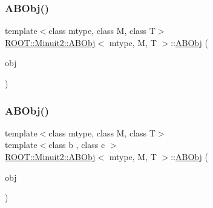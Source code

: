 \subsubsection{\texorpdfstring{ABObj()}{ABObj()}\hspace{0.1cm}{\footnotesize\ttfamily [7/12]}}
{\footnotesize\ttfamily template$<$class mtype, class M, class T$>$ \\
\mbox{\hyperlink{classROOT_1_1Minuit2_1_1ABObj}{R\+O\+O\+T\+::\+Minuit2\+::\+A\+B\+Obj}}$<$ mtype, M, T $>$\+::\mbox{\hyperlink{classROOT_1_1Minuit2_1_1ABObj}{A\+B\+Obj}} (\begin{DoxyParamCaption}\item[{const \mbox{\hyperlink{classROOT_1_1Minuit2_1_1ABObj}{A\+B\+Obj}}$<$ mtype, M, T $>$ \&}]{obj }\end{DoxyParamCaption})\hspace{0.3cm}{\ttfamily [inline]}}

\mbox{\label{classROOT_1_1Minuit2_1_1ABObj_af629f9c316122395ab94459e6cf6ed30}} 
\subsubsection{\texorpdfstring{ABObj()}{ABObj()}\hspace{0.1cm}{\footnotesize\ttfamily [8/12]}}
{\footnotesize\ttfamily template$<$class mtype, class M, class T$>$ \\
template$<$class b , class c $>$ \\
\mbox{\hyperlink{classROOT_1_1Minuit2_1_1ABObj}{R\+O\+O\+T\+::\+Minuit2\+::\+A\+B\+Obj}}$<$ mtype, M, T $>$\+::\mbox{\hyperlink{classROOT_1_1Minuit2_1_1ABObj}{A\+B\+Obj}} (\begin{DoxyParamCaption}\item[{const \mbox{\hyperlink{classROOT_1_1Minuit2_1_1ABObj}{A\+B\+Obj}}$<$ mtype, b, c $>$ \&}]{obj }\end{DoxyParamCaption})\hspace{0.3cm}{\ttfamily [inline]}}

\mbox{\label{classROOT_1_1Minuit2_1_1ABObj_a48561e673ca2a4a05b9e67af09b1736a}} 
